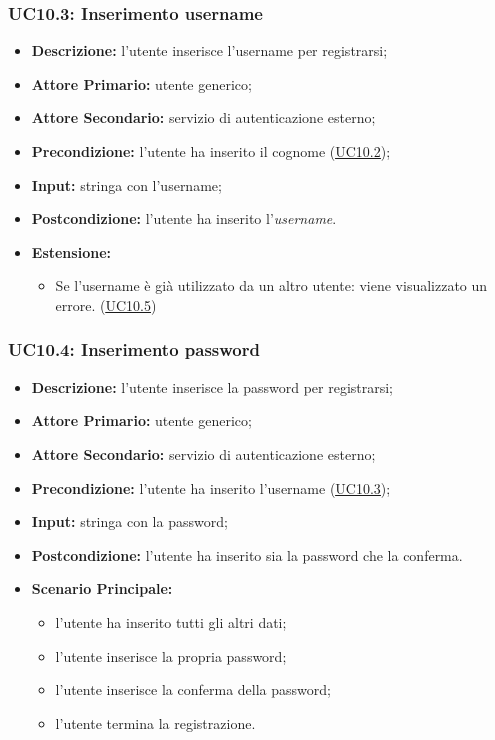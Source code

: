 \subsubsection{UC10.3: Inserimento username}
\label{sec:UC10.3}
\begin{itemize}
    \item \textbf{Descrizione:} l'utente inserisce l'username per registrarsi;
    \item \textbf{Attore Primario:} utente generico;
    \item \textbf{Attore Secondario:} servizio di autenticazione esterno;
    \item \textbf{Precondizione:} l'utente ha inserito il cognome (\hyperref[sec:UC10.2]{\underline{UC10.2}});
    \item \textbf{Input:} stringa con l'username;
    \item \textbf{Postcondizione:} l'utente ha inserito l'\textit{username}.
    \item \textbf{Estensione:} 
    \begin{itemize}
        \item Se l'username è già utilizzato da un altro utente: viene visualizzato un errore. (\hyperref[sec:UC10.5]{\underline{UC10.5}}) 
    \end{itemize} 
\end{itemize}

\subsubsection{UC10.4: Inserimento password}
\label{sec:UC10.4}
\begin{itemize}
    \item \textbf{Descrizione:} l'utente inserisce la password per registrarsi;
    \item \textbf{Attore Primario:} utente generico;
    \item \textbf{Attore Secondario:} servizio di autenticazione esterno;
    \item \textbf{Precondizione:} l'utente ha inserito l'username (\hyperref[sec:UC10.3]{\underline{UC10.3}});
    \item \textbf{Input:} stringa con la password;
    \item \textbf{Postcondizione:} l'utente ha inserito sia la password che la conferma.
    \item \textbf{Scenario Principale:}
        \begin{itemize}
            \item l'utente ha inserito tutti gli altri dati;
            \item l'utente inserisce la propria password;
            \item l'utente inserisce la conferma della password;
            \item l'utente termina la registrazione.
        \end{itemize} 
\end{itemize}

